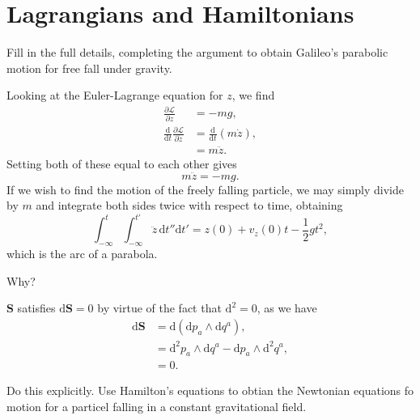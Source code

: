\documentclass[../road-to-reality.tex]{subfiles}
\begin{document}
\section{Lagrangians and Hamiltonians}

\begin{questions}

\question Fill in the full details, completing the argument to obtain
  Galileo's parabolic motion for free fall under gravity.

  \begin{solution}
    Looking at the Euler-Lagrange equation for $z$, we find
    \begin{align*}
      \frac{\partial\mathcal{L}}{\partial{z}} &= -mg, \\
      \frac{\mathrm{d}}{\mathrm{d}t}\frac{\partial{\mathcal{L}}}{\partial{\dot{z}}} &= \frac{\mathrm{d}}{\mathrm{d}t}(m\dot{z}), \\
                                              &= m\ddot{z}.
    \end{align*}
    Setting both of these equal to each other gives
    \[
      m\ddot{z} = -mg.
    \]
    If we wish to find the motion of the freely falling particle, we may
    simply divide by $m$ and integrate both sides twice with respect to time, obtaining
    \[
      \int_{-\infty}^t\int_{-\infty}^{t'}\ddot{z}\,\mathrm{d}t''\mathrm{d}t' = z(0) + v_z(0)t - \frac{1}{2}gt^2,
    \]
    which is the arc of a parabola.
  \end{solution}

\question Why?

  \begin{solution}
    $\mathbf{S}$ satisfies $\mathrm{d}\mathbf{S}=0$ by virtue of the fact that
    $\mathrm{d}^2=0$, as we have
    \begin{align*}
      \mathrm{d}\mathbf{S} &= \mathrm{d}(\mathrm{d}p_a\wedge\mathrm{d}q^a), \\
                           &= \mathrm{d}^2p_a\wedge\mathrm{d}q^a - \mathrm{d}p_a\wedge\mathrm{d}^2q^a, \\
                           &= 0.
    \end{align*}

  \end{solution}

\question Do this explicitly. Use Hamilton's equations to obtian the Newtonian
  equations fo motion for a particel falling in a constant gravitational field.


\end{questions}
\end{document}
